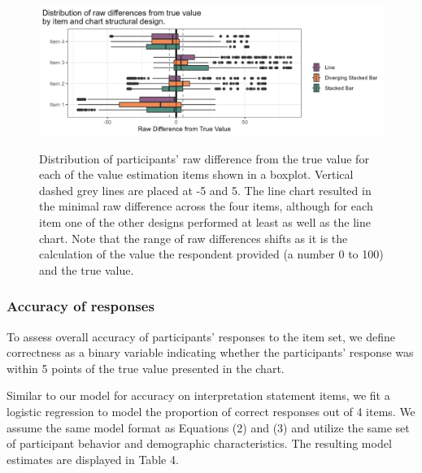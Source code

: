 \documentclass{IEEEcsmag}
\begin{document}
\begin{figure}



\includegraphics[width=36pc]{images/vepatterns.png}
\label{vepatterns}
\caption{Distribution of participants' raw difference from the true value for each of the value estimation items shown in a boxplot. Vertical dashed grey lines are placed at -5 and 5. The line chart resulted in the minimal raw difference across the four items, although for each item one of the other designs performed at least as well as the line chart. Note that the range of raw differences shifts as it is the calculation of the value the respondent provided (a number 0 to 100) and the true value.}
\end{figure}

\subsubsection{Accuracy of responses}\label{accuracy-of-responses-1}

To assess overall accuracy of participants' responses to the item set, we define correctness as a binary variable indicating whether the participants' response was within 5 points of the true value presented in the chart.

Similar to our model for accuracy on interpretation statement items, we fit a logistic regression to model the proportion of correct responses out of 4 items. We assume the same model format as Equations (2) and (3) and utilize the same set of participant behavior and demographic characteristics. The resulting model estimates are displayed in Table 4.
\end{document}
